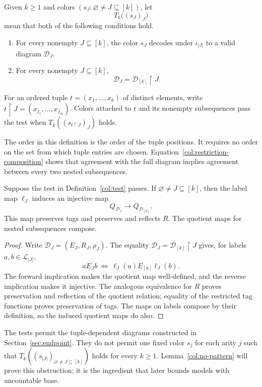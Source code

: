 \begin{definition}\label{col:test}
Given \(k\ge1\) and colors
\((s_J:\varnothing\ne J\subseteq[k])\), let
\[
                     T_k\bigl((s_J)_J\bigr)
\]
mean that both of the following conditions hold.
\begin{enumerate}[label=\textup{(\roman*)}]
\item
For every nonempty \(J\subseteq[k]\), the color \(s_J\) decodes
under \(\iota_{|J|}\) to a valid diagram \(\mathcal D_J\).
\item
For every nonempty \(J\subseteq[k]\),
\[
                    \mathcal D_J
                       =\mathcal D_{[k]}\restriction J.
\]
\end{enumerate}
For an ordered tuple \(t=(x_1,\ldots,x_k)\) of distinct elements,
write \(t\restriction J=(x_{j_1},\ldots,x_{j_m})\).
Colors attached to \(t\) and its nonempty subsequences pass the
test when \(T_k((s_{t\restriction J})_J)\) holds.
\end{definition}

The order in this definition is the order of the tuple positions.
It requires no order on the set from which tuple entries are
chosen.  Equation~\eqref{col:restriction-composition} shows that
agreement with the full diagram implies agreement between every
two nested subsequences.

\begin{lemma}\label{col:quotients}
Suppose the test in Definition~\ref{col:test} passes.  If
\(\varnothing\ne J\subseteq[k]\), then the label map \(\ell_J\)
induces an injective map
\[
                 Q_{\mathcal D_J}\longrightarrow
                 Q_{\mathcal D_{[k]}}.
\]
This map preserves tags and preserves and reflects \(R\).
The quotient maps for nested subsequences compose.
\end{lemma}

\begin{proof}
Write \(\mathcal D_J=(E_J,R_J,\rho_J)\).
The equality
\(\mathcal D_J=\mathcal D_{[k]}\restriction J\) gives, for labels
\(a,b\in\mathcal L_{|J|}\),
\[
 aE_Jb\ \Longleftrightarrow\
       \ell_J(a)E_{[k]}\ell_J(b).
\]
The forward implication makes the quotient map well-defined,
and the reverse implication makes it injective.  The analogous
equivalence for \(R\) proves preservation and reflection of the
quotient relation; equality of the restricted tag functions
proves preservation of tags.  The maps on labels compose by
their definition, so the induced quotient maps do also.
\end{proof}

The tests permit the tuple-dependent diagrams constructed in
Section~\ref{sec:endpoint}. They do not permit one fixed color \(s_j\)
for each arity \(j\) such that
\(T_k((s_{|J|})_{\varnothing\ne J\subseteq[k]})\) holds for every
\(k\ge1\). Lemma~\ref{col:no-pattern} will prove this obstruction;
it is the ingredient that later bounds models with uncountable base.
